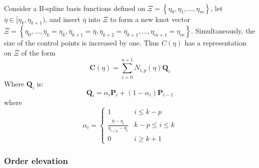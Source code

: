 \paragraph{}
Consider a B-spline basis functions defined on 
$\Xi = \left\{
    \eta_0 ,\eta_1,\dots,\eta_m 
    \right\}$,
let $\overline{\eta} \in [\eta_k ,\eta_{k+1} )$, and insert $\overline{\eta}$ into $\Xi$ to form a new knot vector 
$\overline{\Xi} = \left\{
    \eta_0 ,\dots, \overline{\eta}_k = \eta_k , 
    \overline{\eta}_{k+1} = \overline{\eta}, 
    \overline{\eta}_{k+2} = \overline{\eta}_{k+1} ,
    \dots,\eta_{m+1} = \eta_m
    \right\}$.
Simultaneously, the size of the control points is increased by one. Thus $C(\eta)$ has a representation on $\overline{\Xi}$ of the form
\begin{equation}
    \mathbf{C}(\eta) = \sum_{i=0}^{n+1}
                        \overline{N}_{i,p} (\eta)
                        \mathbf{Q}_i
\end{equation}
Where $\mathbf{Q}_i$ is:
\begin{equation}
    \mathbf{Q}_i = \alpha_i \mathbf{P}_i +
                    (1-\alpha_i) \mathbf{P}_{i-1}
\end{equation}
where
\begin{equation}
    \alpha_i =  \begin{cases}
                    1       & i \leq k-p \\
                    \frac{ \overline{\eta} -\eta_i }{ \eta_{i+p} - \eta_i } & k-p \leq i \leq k \\
                    0 & i \geq k+1                          
                \end{cases}
\end{equation}


\subsubsection{Order elevation}
\label{lr_sec:nurbs_order_ele}

